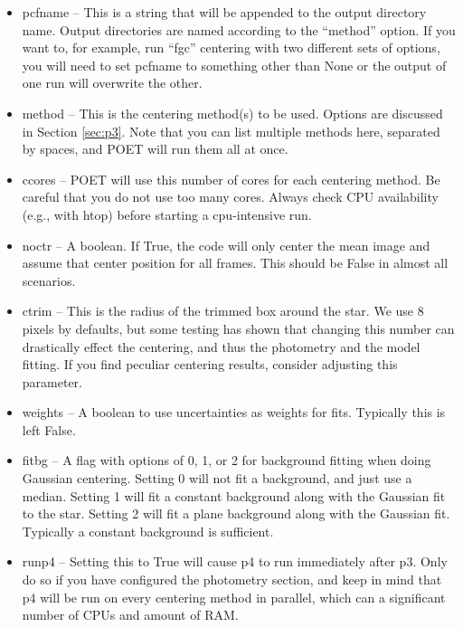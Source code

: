 \documentclass[letterpaper,12pt]{article}
\begin{document}
\begin{itemize}
\item pcfname -- This is a string that will be appended to the output
  directory name. Output directories are named according to the ``method''
  option. If you want to, for example, run ``fgc'' centering with two
  different sets of options, you will need to set pcfname to something
  other than None or the output of one run will overwrite the other.
  
\item method -- This is the centering method(s) to be used. Options are
  discussed in Section \ref{sec:p3}. Note that you can list multiple methods
  here, separated by spaces, and POET will run them all at once.

\item ccores -- POET will use this number of cores for each centering
  method.  Be careful that you do not use too many cores. Always check
  CPU availability (e.g., with htop) before starting a cpu-intensive
  run.

\item noctr -- A boolean. If True, the code will only center the mean
  image and assume that center position for all frames. This should
  be False in almost all scenarios.

\item ctrim -- This is the radius of the trimmed box around the
  star. We use 8 pixels by defaults, but some testing has shown that
  changing this number can drastically effect the centering, and thus
  the photometry and the model fitting. If you find peculiar centering
  results, consider adjusting this parameter.

\item weights -- A boolean to use uncertainties as weights for fits.
  Typically this is left False.

\item fitbg -- A flag with options of 0, 1, or 2 for background
  fitting when doing Gaussian centering. Setting 0 will not fit a
  background, and just use a median. Setting 1 will fit a constant
  background along with the Gaussian fit to the star. Setting 2 will
  fit a plane background along with the Gaussian fit. Typically a
  constant background is sufficient.

\item runp4 -- Setting this to True will cause p4 to run immediately
  after p3.  Only do so if you have configured the photometry section,
  and keep in mind that p4 will be run on every centering method in
  parallel, which can a significant number of CPUs and amount of RAM.


\end{itemize}
\end{document}
